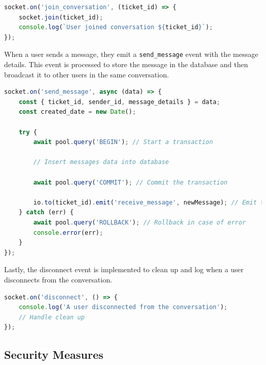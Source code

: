 \begin{lstlisting}[language=Javascript, breaklines=true, caption=Socket.io join\_conversation event]
socket.on('join_conversation', (ticket_id) => {
	socket.join(ticket_id);
	console.log(`User joined conversation ${ticket_id}`);
});
\end{lstlisting}	

When a user sends a message, they emit a \texttt{send\_message} event with the message details. This event is processed to store the message in the database and then broadcast it to other users in the same conversation.


\begin{lstlisting}[language=Javascript, breaklines=true, caption=Socket.io send\_message event]
socket.on('send_message', async (data) => {
	const { ticket_id, sender_id, message_details } = data;
	const created_date = new Date();
	
	try {
		await pool.query('BEGIN'); // Start a transaction
		
		// Insert messages data into database
		
		await pool.query('COMMIT'); // Commit the transaction
		
		io.to(ticket_id).emit('receive_message', newMessage); // Emit the new message to the room
	} catch (err) {
		await pool.query('ROLLBACK'); // Rollback in case of error
		console.error(err);
	}
});

\end{lstlisting}	

Lastly, the disconnect event is implemented to clean up and log when a user disconnects from the conversation.
\begin{lstlisting}[language=Javascript, breaklines=true, caption=Socket.io disconnect event]
socket.on('disconnect', () => {
	console.log('A user disconnected from the conversation');
	// Handle clean up
});
\end{lstlisting}

\newpage
\subsection{Security Measures}
